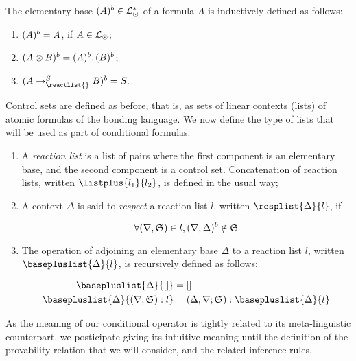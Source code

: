 \begin{definition}
  The elementary base $(A)^{b} \in \mathcal{L}_{\odot}^*$ of a formula $A$ is
  inductively defined as follows:

  \begin{enumerate}
  \item $(A)^{b} = A$, if $A \in \mathcal{L}_{\odot}$;
  \item $(A \otimes B)^{b} = (A)^{b}, (B)^{b}$;
  \item $\elembases{A \rightarrow_{\reactlist{}}^S B} = S$.
  \end{enumerate}
\end{definition}

Control sets are defined as before, that is, as sets of linear contexts (lists)
of atomic formulas of the bonding language. We now define the type of lists that
will be used as part of conditional formulas.

\begin{definition}
  \begin{enumerate}
  \item A \emph{reaction list} is a list of pairs where the first component is
    an elementary base, and the second component is a control set. Concatenation
    of reaction lists, written $\listplus{l_1}{l_2}$, is defined in the usual
    way;
  \item A context $\Delta$ is said to \emph{respect} a reaction list $l$,
    written $\resplist{\Delta}{l}$, if

    \[
      \forall (\nabla, \mathfrak{S}_{})\in l, (\nabla, \Delta)^{b} \notin \mathfrak{S}_{}
    \]

  \item The operation of adjoining an elementary base $\Delta$ to a reaction
    list $l$, written $\basepluslist{\Delta}{l}$, is recursively defined as
    follows:

    \begin{align*}
      \basepluslist{\Delta}{[]} &= [] \\
      \basepluslist{\Delta}{(\nabla;\ctrlset{}):l} &= (\Delta,\nabla;\ctrlset{}):\basepluslist{\Delta}{l}
    \end{align*}
  \end{enumerate}
\end{definition}

As the meaning of our conditional operator is tightly related to its
meta-linguistic counterpart, we posticipate giving its intuitive meaning until
the definition of the provability relation that we will consider, and the
related inference rules.

